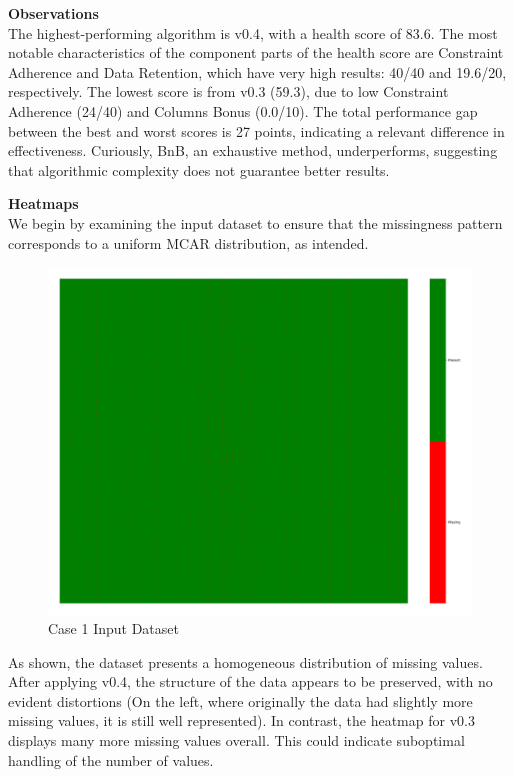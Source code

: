 \documentclass[a4paper,12pt]{article}
\begin{document}
\textbf{Observations}\\
The highest-performing algorithm is v0.4, with a health score of 83.6. The most notable characteristics of the component parts of the health score are Constraint Adherence and Data Retention, which have very high results: 40/40 and 19.6/20, respectively. The lowest score is from v0.3 (59.3), due to low Constraint Adherence (24/40) and Columns Bonus (0.0/10). The total performance gap between the best and worst scores is 27 points, indicating a relevant difference in effectiveness. Curiously, BnB, an exhaustive method, underperforms, suggesting that algorithmic complexity does not guarantee better results.

\textbf{Heatmaps}\\
We begin by examining the input dataset to ensure that the missingness pattern corresponds to a uniform MCAR distribution, as intended.

\begin{figure}[H]
    \centering
    \includegraphics[width=0.5\linewidth]{case1_heatmap_erased.png}
    \caption{Case 1 Input Dataset}
\end{figure}

As shown, the dataset presents a homogeneous distribution of missing values. After applying v0.4, the structure of the data appears to be preserved, with no evident distortions (On the left, where originally the data had slightly more missing values, it is still well represented). In contrast, the heatmap for v0.3 displays many more missing values overall. This could indicate suboptimal handling of the number of values.
\end{document}
